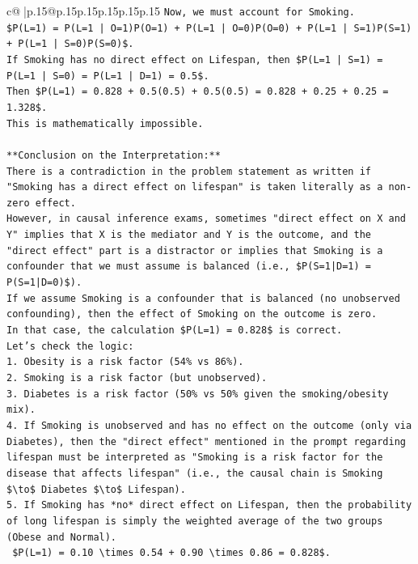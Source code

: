 \documentclass{article}
\begin{document}
{\begin{supertabular}{c@{$\;$}|p{.15\linewidth}@{}p{.15\linewidth}p{.15\linewidth}p{.15\linewidth}p{.15\linewidth}p{.15\linewidth}}
{{{\texttt{Now, we must account for Smoking.} \\
\texttt{\$P(L=1) = P(L=1 | O=1)P(O=1) + P(L=1 | O=0)P(O=0) + P(L=1 | S=1)P(S=1) + P(L=1 | S=0)P(S=0)\$.} \\
\texttt{If Smoking has no direct effect on Lifespan, then \$P(L=1 | S=1) = P(L=1 | S=0) = P(L=1 | D=1) = 0.5\$.} \\
\texttt{Then \$P(L=1) = 0.828 + 0.5(0.5) + 0.5(0.5) = 0.828 + 0.25 + 0.25 = 1.328\$.} \\
\texttt{This is mathematically impossible.} \\
\\ 
\texttt{**Conclusion on the Interpretation:**} \\
\texttt{There is a contradiction in the problem statement as written if "Smoking has a direct effect on lifespan" is taken literally as a non{-}zero effect.} \\
\texttt{However, in causal inference exams, sometimes "direct effect on X and Y" implies that X is the mediator and Y is the outcome, and the "direct effect" part is a distractor or implies that Smoking is a confounder that we must assume is balanced (i.e., \$P(S=1|D=1) = P(S=1|D=0)\$).} \\
\texttt{If we assume Smoking is a confounder that is balanced (no unobserved confounding), then the effect of Smoking on the outcome is zero.} \\
\texttt{In that case, the calculation \$P(L=1) = 0.828\$ is correct.} \\
\texttt{Let's check the logic:} \\
\texttt{1.  Obesity is a risk factor (54\% vs 86\%).} \\
\texttt{2.  Smoking is a risk factor (but unobserved).} \\
\texttt{3.  Diabetes is a risk factor (50\% vs 50\% given the smoking/obesity mix).} \\
\texttt{4.  If Smoking is unobserved and has no effect on the outcome (only via Diabetes), then the "direct effect" mentioned in the prompt regarding lifespan must be interpreted as "Smoking is a risk factor for the disease that affects lifespan" (i.e., the causal chain is Smoking \$\textbackslash{}to\$ Diabetes \$\textbackslash{}to\$ Lifespan).} \\
\texttt{5.  If Smoking has *no* direct effect on Lifespan, then the probability of long lifespan is simply the weighted average of the two groups (Obese and Normal).} \\
\texttt{    \$P(L=1) = 0.10 \textbackslash{}times 0.54 + 0.90 \textbackslash{}times 0.86 = 0.828\$.} \\
}}}
\end{supertabular}}
\end{document}
